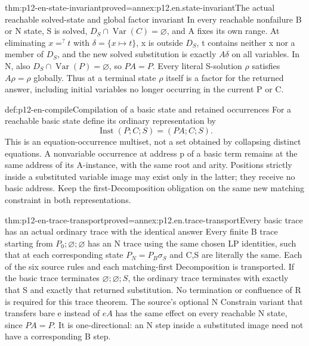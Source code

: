 \begin{hblemma}{thm:p12-en-state-invariant}{proved=annex:p12.en.state-invariant}{The actual reachable solved-state and global factor invariant}
In every reachable nonfailure B or N state, S is solved,
\(D_S\cap\operatorname{Var}(C)=\varnothing\), and A fixes its own
range. At eliminating \(x=^{?}t\) with \(\delta=\{x\mapsto t\}\),
x is outside \(D_S\), t contains neither x nor a member of \(D_S\),
and the new solved substitution is exactly \(A\delta\) on all
variables. In N, also \(D_S\cap\operatorname{Var}(P)=\varnothing\),
so \(P A=P\). Every literal S-solution \(\rho\) satisfies
\(A\rho=\rho\) globally. Thus at a terminal state \(\rho\)
itself is a factor for the returned answer, including initial
variables no longer occurring in the current P or C.
\end{hblemma}

\begin{hbdefinition}{def:p12-en-compile}{Compilation of a basic state and retained occurrences}
For a reachable basic state define its ordinary representation by
\[
         \operatorname{Inst}(P;C;S)=(P A;C;S).
\]
This is an equation-occurrence multiset, not a set obtained by
collapsing distinct equations. A nonvariable occurrence at address p
of a basic term remains at the same address of its A-instance, with
the same root and arity. Positions strictly inside a substituted
variable image may exist only in the latter; they receive no basic
address. Keep the first-Decomposition obligation on the same new
matching constraint in both representations.
\end{hbdefinition}

\begin{hbtheorem}{thm:p12-en-trace-transport}{proved=annex:p12.en.trace-transport}{Every basic trace has an actual ordinary trace with the identical answer}
Every finite B trace starting from \(P_0;\varnothing;\varnothing\)
has an N trace using the same chosen LP identities, such that at
each corresponding state \(P_N=P_B\sigma_S\) and C,S are literally
the same. Each of the six source rules and each matching-first
Decomposition is transported. If the basic trace terminates
\(\varnothing;\varnothing;S\), the ordinary trace terminates
with exactly that S and exactly that returned substitution.
No termination or confluence of R is required for this trace theorem.
The source's optional N Constrain variant that transfers bare e
instead of \(e A\) has the same effect on every reachable N state,
since \(P A=P\).
It is one-directional: an N step inside a substituted image need
not have a corresponding B step.
\end{hbtheorem}

